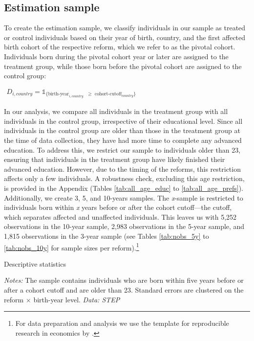 \subsection{Estimation sample}

To create the estimation sample, we classify individuals in our sample as treated or control individuals based on their year of birth, country, and the first affected birth cohort of the respective reform, which we refer to as the pivotal cohort. Individuals born during the pivotal cohort year or later are assigned to the treatment group, while those born before the pivotal cohort are assigned to the control group:

{\centering
	$ \displaystyle
	\begin{aligned}
		D_{i, country} = \mathds{1}_{\{\text{birth-year}_{i, country} \text{ } \geq \text{ cohort-cutoff}_{country}\}}
	\end{aligned}
	$
\par}%

In our analysis, we compare all individuals in the treatment group with all individuals in the control group, irrespective of their educational level. Since all individuals in the control group are older than those in the treatment group at the time of data collection, they have had more time to complete any advanced education. To address this, we restrict our sample to individuals older than 23, ensuring that individuals in the treatment group have likely finished their advanced education. However, due to the timing of the reforms, this restriction affects only a few individuals. A robustness check, excluding this age restriction, is provided in the Appendix (Tables \ref{tab:all_age_educ} to \ref{tab:all_age_prefs}). Additionally, we create 3, 5, and 10-years samples. The \textit{x}-sample is restricted to individuals born within \textit{x} years before or after the cohort cutoff---the cutoff, which separates affected and unaffected individuals. This leaves us with 5,252 observations in the 10-year sample, 2,983 observations in the 5-year sample, and 1,815 observations in the 3-year sample (see Tables \ref{tab:nobs_5y} to \ref{tab:nobs_10y} for sample sizes per reform).\footnote{For data preparation and analysis we use the template for reproducible research in economics by \citet{von_gaudecker_templates_2019}.}

\begin{table}[htbp]
	\caption{Descriptive statistics}
	\label{tab:descriptives}
	\centering
	\begin{threeparttable}
		
		\begin{tablenotes}
			\footnotesize
			\item \textit{Notes:} The sample contains individuals who are born within five years before or after a cohort cutoff and are older than 23. Standard errors are clustered on the reform $\times$ birth-year level. \textit{Data: STEP}
		\end{tablenotes}
	\end{threeparttable}
\end{table}

